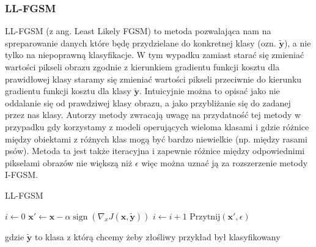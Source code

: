 \documentclass[
    left=2.5cm,         %
    right=2.5cm,        %
    top=2.5cm,          %
    bottom=3cm,         %
    bindingoffset=6mm,  %
    nohyphenation=false %
]{eiti/eiti-thesis}
\renewcommand{\vec}[1]{\mathbf{#1}}
\begin{document}
    \subsubsection{LL-FGSM}\label{llfgsm-algorithm}
    LL-FGSM (z ang. Least Likely FGSM) to metoda pozwalająca nam na spreparowanie danych które będę przydzielane do
    konkretnej klasy (ozn. $\vec{\widetilde{y}}$), a nie tylko na niepoprawną klasyfikacje. W tym wypadku zamiast starać się
    zmieniać wartości pikseli obrazu zgodnie z kierunkiem gradientu funkcji kosztu dla prawidłowej klasy
    staramy się zmieniać wartości pikseli przeciwnie do kierunku gradientu funkcji kosztu dla klasy $\vec{\widetilde{y}}$.
    Intuicyjnie można to opisać jako nie oddalanie się od prawdziwej klasy obrazu, a jako przybliżanie się do zadanej
    przez nas klasy.
    Autorzy metody zwracają uwagę na przydatność tej metody
    w przypadku gdy korzystamy z modeli operujących wieloma klasami i gdzie różnice między obiektami z różnych klas mogą
    być bardzo niewielkie (np. między rasami psów). Metoda ta jest także iteracyjna i zapewnie różnice między
    odpowiednimi pikselami obrazów nie większą niż $\epsilon$ więc można uznać ją za rozszerzenie metody I-FGSM.

    \begin{algorithm}
    \caption{LL-FGSM}\label{LLFGSM}
    \begin{algorithmic}[1]
    \State $i \gets 0$
        \State $\vec{x'} \gets \vec{x} - \alpha\operatorname{sign}(\nabla_{x} J(\vec{x}, \vec{\widetilde{y}}))$
        \State $i \gets i+1$
        \State $\text{Przytnij}(\vec{x'}, \epsilon)$
    \EndWhile
    \end{algorithmic}
    \end{algorithm}
gdzie $\vec{\widetilde{y}}$ to klasa z którą chcemy żeby złośliwy przykład był klasyfikowany
\end{document}
